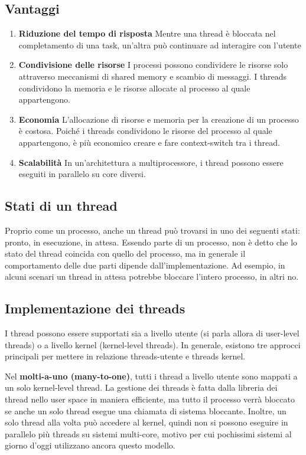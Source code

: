 \documentclass[a4paper]{article}
\begin{document}
\subsection{Vantaggi}
\begin{enumerate}
   \item \textbf{Riduzione del tempo di risposta} Mentre una thread è bloccata nel completamento di una task, un'altra può continuare ad interagire con l'utente
   \item \textbf{Condivisione delle risorse} I processi possono condividere le risorse solo attraverso meccanismi di shared memory e scambio di messaggi. I threads condividono la memoria e le risorse allocate al processo al quale appartengono.
   \item \textbf{Economia} L'allocazione di risorse e memoria per la creazione di un processo è costosa. Poiché i threads condividono le risorse del processo al quale appartengono, è più economico creare e fare context-switch tra i thread.
   \item \textbf{Scalabilità} In un'architettura a multiprocessore, i thread possono essere eseguiti in parallelo su core diversi.
\end{enumerate}

\subsection{Stati di un thread}
Proprio come un processo, anche un thread può trovarsi in uno dei seguenti stati: pronto, in esecuzione, in attesa. Essendo parte di un processo, non è detto che lo stato del thread coincida con quello del processo, ma in generale il comportamento delle due parti dipende dall'implementazione. Ad esempio, in alcuni scenari un thread in attesa potrebbe bloccare l'intero processo, in altri no.

\subsection{Implementazione dei threads}
I thread possono essere supportati sia a livello utente (si parla allora di user-level threads) o a livello kernel (kernel-level threads). In generale, esistono tre approcci principali per mettere in relazione threads-utente e threads kernel.

Nel \textbf{molti-a-uno (many-to-one)}, tutti i thread a livello utente sono mappati a un solo kernel-level thread. La gestione dei threads è fatta dalla libreria dei thread nello user space in maniera efficiente, ma tutto il processo verrà bloccato se anche un solo thread esegue una chiamata di sistema bloccante. Inoltre, un solo thread alla volta può accedere al kernel, quindi non si possono eseguire in parallelo più threads su sistemi multi-core, motivo per cui pochissimi sistemi al giorno d'oggi utilizzano ancora questo modello.
\end{document}
